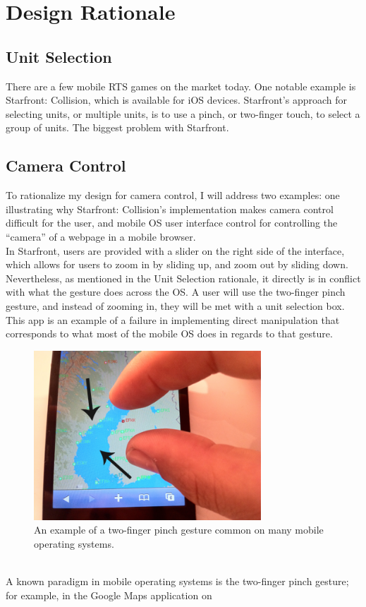 \documentclass[11pt]{article}
\begin{document}
\section{Design Rationale}
	\subsection{Unit Selection}
	There are a few mobile RTS games on the market today. One notable example is Starfront: Collision, which is available for iOS devices. Starfront's approach for selecting units, or multiple units, is to use a pinch, or two-finger touch, to select a group of units. The biggest problem with Starfront.
	\subsection{Camera Control}
	To rationalize my design for camera control, I will address two examples: one illustrating why Starfront: Collision's implementation makes camera control difficult for the user, and mobile OS user interface control for controlling the ``camera'' of a webpage in a mobile browser. \\
	\indent In Starfront, users are provided with a slider on the right side of the interface, which allows for users to zoom in by sliding up, and zoom out by sliding down. Nevertheless, as mentioned in the Unit Selection rationale, it directly is in conflict with what the gesture does across the OS. A user will use the two-finger pinch gesture, and instead of zooming in, they will be met with a unit selection box. This app is an example of a failure in implementing direct manipulation that corresponds to what most of the mobile OS does in regards to that gesture.
	\begin{figure}[h]
	\begin{center}
	\includegraphics[height = 2.5in]{iphone-two-finger-pinch}
	\caption{An example of a two-finger pinch gesture common on many mobile operating systems.}
	\end{center}
	\end{figure} \\
	\indent A known paradigm in mobile operating systems is the two-finger pinch gesture; for example, in the Google Maps application on
\end{document}
